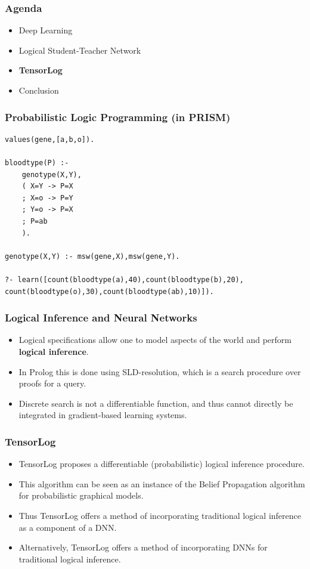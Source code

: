 \documentclass{beamer}
\begin{document}
\begin{frame}
\frametitle{Agenda}
\begin{itemize}
	\item Deep Learning
	\item Logical Student-Teacher Network
	\item \textbf{TensorLog}
	\item Conclusion
\end{itemize}
\end{frame}

\begin{frame}[fragile]
\frametitle{Probabilistic Logic Programming (in PRISM)}
\begin{verbatim}
values(gene,[a,b,o]).

bloodtype(P) :-
    genotype(X,Y),
    ( X=Y -> P=X
    ; X=o -> P=Y
    ; Y=o -> P=X
    ; P=ab
    ).
    
genotype(X,Y) :- msw(gene,X),msw(gene,Y).

?- learn([count(bloodtype(a),40),count(bloodtype(b),20),
count(bloodtype(o),30),count(bloodtype(ab),10)]).
\end{verbatim}
\end{frame}

\begin{frame}
\frametitle{Logical Inference and Neural Networks}
\begin{itemize}
	\item Logical specifications allow one to model aspects of the world and perform \textbf{logical inference}.
	\item In Prolog this is done using SLD-resolution, which is a search procedure over proofs for a query.
	\item Discrete search is not a differentiable function, and thus cannot directly be integrated in gradient-based learning systems.
\end{itemize}
\end{frame}

\begin{frame}
\frametitle{TensorLog}
\begin{itemize}
	\item TensorLog proposes a differentiable (probabilistic) logical inference procedure.
	\item This algorithm can be seen as an instance of the Belief Propagation algorithm for probabilistic graphical models.
	\item Thus TensorLog offers a method of incorporating traditional logical inference as a component of a DNN.
	\item Alternatively, TensorLog offers a method of incorporating DNNs for traditional logical inference.
\end{itemize}
\end{frame}
\end{document}
